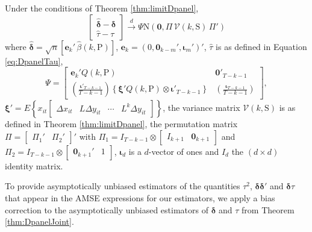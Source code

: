 \begin{thm}
  \label{thm:DpanelJoint}
  Under the conditions of Theorem \ref{thm:limitDpanel},
  \[
    \left[
      \begin{array}{c} 
        \widehat{\boldsymbol{\delta}} - \boldsymbol{\delta} \\ \widehat{\tau} - \tau 
      \end{array} 
    \right] \overset{d}{\rightarrow} \Psi \mbox{N}\left(\mathbf{0}, \Pi\,\mathcal{V}\left(k,\text{S}\right)\,\Pi'\right)
  \]
  where $\widehat{\boldsymbol{\delta}} = \sqrt{n}[ \mathbf{e}_k' \,\widehat{\beta}(k,\text{P})]$, $\mathbf{e}_k = (0, \mathbf{0}_{k-m}', \boldsymbol{\iota}_m')'$,  $\widehat{\tau}$ is as defined in Equation \ref{eq:DpanelTau}, 
\[
  \Psi = \left[
  \begin{array}{cc}
    \displaystyle
    \mathbf{e}_k' Q(k,\text{P}) & \mathbf{0}'_{T-k-1}\\
    \left( \frac{\boldsymbol{\iota}'_{T-k-1}}{T-k-1} \right)  \left\{ \boldsymbol{\xi}' Q(k,\text{P}) \otimes \boldsymbol{\iota}'_{T-k-1} \right\}& \displaystyle \left(\frac{\boldsymbol{\iota}_{T-k-1}}{T-k-1}\right) 
  \end{array}
\right],
\]
  $\boldsymbol{\xi}' = E\left\{ x_{it} \left[
    \begin{array}{cccc}
       \Delta x_{it} & L \Delta y_{it} & \cdots & L^k \Delta y_{it}   \end{array} \right]\right\}$,
  the variance matrix $\mathcal{V}(k,\text{S})$ is as defined in Theorem \ref{thm:limitDpanel}, the permutation matrix $\Pi = \left[
  \begin{array}{cc}
    \Pi_1' & \Pi_2'
  \end{array}
\right]'$ with $\Pi_1 = I_{T-k-1} \otimes \left[
\begin{array}{cc}
  I_{k+1} & \mathbf{0}_{k+1}
\end{array}
\right]$ and $\Pi_2 = I_{T-k-1}\otimes \left[
\begin{array}{cc}
  \mathbf{0}_{k+1}' & 1
\end{array}
\right]$,
  $\boldsymbol{\iota}_{d}$ is a $d$-vector of ones and $I_d$ the $(d\times d)$ identity matrix.
\end{thm}

To provide asymptotically unbiased estimators of the quantities $\tau^2$, $\boldsymbol{\delta}\boldsymbol{\delta}'$ and $\boldsymbol{\delta}\tau$ that appear in the AMSE expressions for our estimators, we apply a bias correction to the asymptotically unbiased estimators of $\boldsymbol{\delta}$ and $\tau$ from Theorem \ref{thm:DpanelJoint}.

